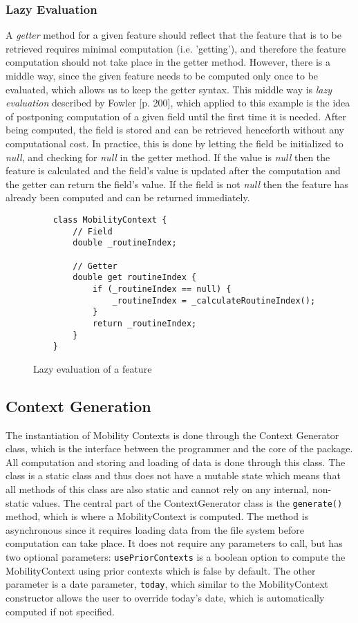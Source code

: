 \subsubsection*{Lazy Evaluation}
A \textit{getter} method for a given feature should reflect that the feature that is to be retrieved requires minimal computation (i.e. 'getting'), and therefore the feature computation should not take place in the getter method. However, there is a middle way, since the given feature needs to be computed only once to be evaluated, which allows us to keep the getter syntax. This middle way is \textit{lazy evaluation} described by Fowler \cite{fowler-PEEA} [p. 200], which applied to this example is the idea of postponing computation of a given field until the first time it is needed. After being computed, the field is stored and can be retrieved henceforth without any computational cost. In practice, this is done by letting the field be initialized to \textit{null}, and checking for \textit{null} in the getter method. If the value is \textit{null} then the feature is calculated and the field's value is updated after the computation and the getter can return the field's value. If the field is not \textit{null} then the feature has already been computed and can be returned immediately.

\begin{figure}
    \centering
    \begin{verbatim}
    class MobilityContext {
        // Field
        double _routineIndex;
        
        // Getter
        double get routineIndex {
            if (_routineIndex == null) {
                _routineIndex = _calculateRoutineIndex();
            }
            return _routineIndex;
        }
    }
    \end{verbatim}
    \caption{Lazy evaluation of a feature}
    \label{fig:lazy-evaluation}
\end{figure}


\subsection{Context Generation}
\label{subsection:context-generation}
The instantiation of Mobility Contexts is done through the Context Generator class, which is the interface between the programmer and the core of the package. All computation and storing and loading of data is done through this class. The class is a static class and thus does not have a mutable state which means that all methods of this class are also static and cannot rely on any internal, non-static values. The central part of the ContextGenerator class is the \verb|generate()| method, which is where a MobilityContext is computed. The method is asynchronous since it requires loading data from the file system before computation can take place. It does not require any parameters to call, but has two optional parameters: \verb|usePriorContexts| is a boolean option to compute the MobilityContext using prior contexts which is false by default. The other parameter is a date parameter, \verb|today|, which similar to the MobilityContext constructor allows the user to override today's date, which is automatically computed if not specified.

